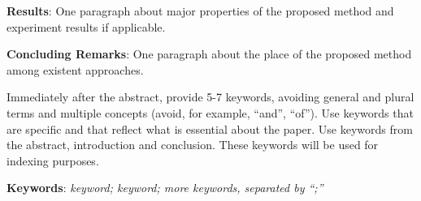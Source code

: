 \documentclass[12pt, twoside]{article}
\begin{document}
{	\noindent
	\textbf{Results}: One paragraph about major properties of the proposed method and experiment results if applicable.
	
	\noindent
	\textbf{Concluding Remarks}: One paragraph about the place of the proposed method among existent approaches.
		
	\noindent
	Immediately after the abstract, provide 5-7 keywords, avoiding general and plural terms and multiple concepts (avoid, for example, ``and'', ``of'').
	Use keywords that are specific and that reflect what is essential about the paper.
	Use keywords from the abstract, introduction and conclusion.
	These keywords will be used for indexing purposes.
		
	\noindent
    	\textbf{Keywords}: \emph{keyword; keyword; more keywords, separated by ``;''}}


\maketitle
\linenumbers
\end{document}
